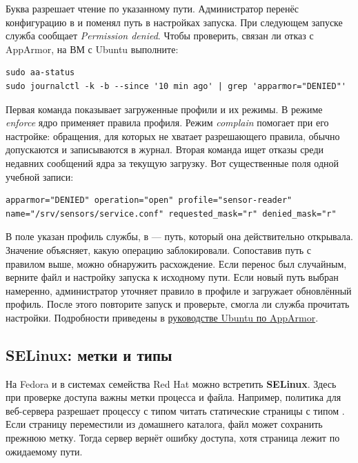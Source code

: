 Буква  разрешает чтение по указанному пути. Администратор перенёс
конфигурацию в  и поменял путь в
настройках запуска. При следующем запуске служба сообщает
\emph{Permission denied}. Чтобы проверить, связан ли отказ с AppArmor,
на ВМ с Ubuntu выполните:

\begin{verbatim}
sudo aa-status
sudo journalctl -k -b --since '10 min ago' | grep 'apparmor="DENIED"'
\end{verbatim}

Первая команда показывает загруженные профили и их режимы.
В режиме \emph{enforce} ядро применяет правила профиля. Режим
\emph{complain} помогает при его настройке: обращения, для которых
не хватает разрешающего правила, обычно допускаются и записываются
в журнал. Вторая команда ищет отказы среди недавних сообщений ядра
за текущую загрузку. Вот существенные поля одной учебной записи:

\begin{verbatim}
apparmor="DENIED" operation="open" profile="sensor-reader"
name="/srv/sensors/service.conf" requested_mask="r" denied_mask="r"
\end{verbatim}

В поле  указан профиль службы, в  --- путь,
который она действительно открывала. Значение 
объясняет, какую операцию заблокировали. Сопоставив путь с правилом
выше, можно обнаружить расхождение. Если перенос был случайным,
верните файл и настройку запуска к исходному пути. Если новый путь
выбран намеренно, администратор уточняет правило в профиле и загружает
обновлённый профиль. После этого повторите запуск и проверьте, смогла
ли служба прочитать настройки. Подробности приведены в
\href{https://ubuntu.com/server/docs/how-to/security/apparmor/}{руководстве Ubuntu по AppArmor}.

\subsection{SELinux: метки и типы}

На Fedora и в системах семейства Red Hat можно встретить
\textbf{SELinux}. Здесь при проверке доступа важны метки процесса и
файла. Например, политика для веб-сервера разрешает процессу с типом
 читать статические страницы с типом .
Если страницу переместили из домашнего каталога, файл может сохранить
прежнюю метку. Тогда сервер вернёт ошибку доступа, хотя страница лежит
по ожидаемому пути.

